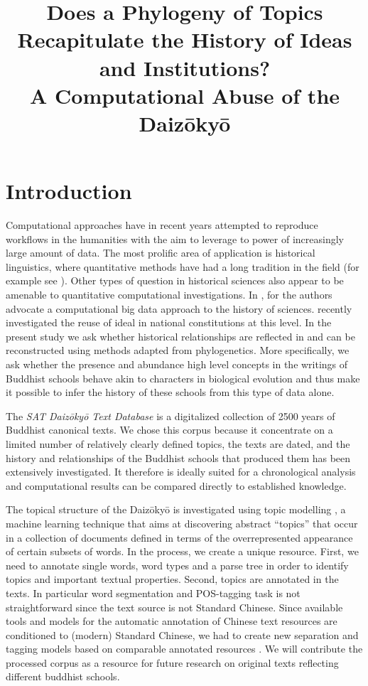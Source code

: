 \documentclass[a4paper,10pt]{article}
\title{Does a Phylogeny of Topics Recapitulate the History of Ideas and 
  Institutions? \\
  A Computational Abuse of the Daiz{\=o}ky{\=o}}
\date{}
\newcommand{\TODO}[1]{\begingroup\color{red}#1\endgroup}
\newcommand{\NR}[1]{\begingroup\color{orange}#1\endgroup}
\begin{document}
\maketitleabstract

\section{Introduction}


Computational approaches have in recent years attempted to reproduce
workflows in the humanities with the aim to leverage to power of
increasingly large amount of data. The most prolific area of application is
historical linguistics, where quantitative methods have had a long
tradition in the field (for example see 
\cite{levinson_tools_2012,gray_language-tree_2003,croft2008evolutionary}). 
Other types of question in historical sciences also appear to be
amenable to quantitative computational investigations. In
\cite{Laubichler:13}, for the authors advocate a computational big data
approach to the history of sciences. \cite{Rockmore:16} recently
investigated the reuse of ideal in national constitutions at this level. In
the present study we ask whether historical relationships are reflected in
and can be reconstructed using methods adapted from phylogenetics. More
specifically, we ask whether the presence and abundance high level concepts
in the writings of Buddhist \TODO{schools} behave akin to characters in
biological evolution and thus make it possible to infer the history of
these \TODO{schools} from this type of data alone.

The \textit{SAT Daiz{\=o}ky{\=o} Text Database}  is a digitalized
collection of 2500 years of Buddhist canonical texts. We chose this corpus
because it concentrate on a limited number of relatively clearly defined
topics, the texts are dated, and the history and relationships of the
Buddhist schools that produced them has been extensively investigated. It
therefore is ideally suited for a chronological analysis and computational
results can be compared directly to established knowledge.

The topical structure of the Daiz{\=o}ky{\=o} is investigated using topic
modelling \cite{Blei12}, a machine learning technique that aims at
discovering abstract ``topics'' that occur in a collection of documents
defined in terms of the overrepresented appearance of certain subsets of
words. In the process, we create a unique resource. First, we need to
annotate single words, word types and a parse tree in order to identify
topics and important textual properties. Second, topics are annotated in
the texts.  In particular word segmentation and POS-tagging task is not
straightforward since the text source is not Standard Chinese. Since
available tools and models for the automatic annotation of Chinese text
resources are conditioned to \NR{(modern)} Standard Chinese, we had to create new
separation and tagging models based on comparable annotated resources
\cite{Lee14}.  We will contribute the processed corpus as a resource for
future research on original texts reflecting different buddhist
\TODO{schools}.
\end{document}
